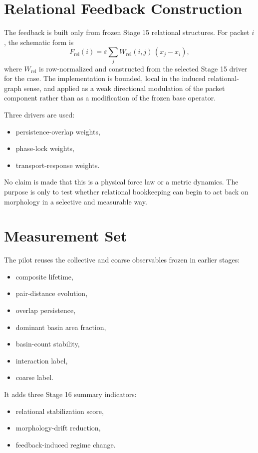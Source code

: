 \documentclass[11pt]{article}
\begin{document}
\section{Relational Feedback Construction}

The feedback is built only from frozen Stage 15 relational structures. For packet $i$, the schematic form is
\[
F_{\mathrm{rel}}(i) = \varepsilon \sum_j W_{\mathrm{rel}}(i,j)\,(x_j - x_i),
\]
where $W_{\mathrm{rel}}$ is row-normalized and constructed from the selected Stage 15 driver for the case. The implementation is bounded, local in the induced relational-graph sense, and applied as a weak directional modulation of the packet component rather than as a modification of the frozen base operator.

Three drivers are used:
\begin{itemize}
\item persistence-overlap weights,
\item phase-lock weights,
\item transport-response weights.
\end{itemize}

No claim is made that this is a physical force law or a metric dynamics. The purpose is only to test whether relational bookkeeping can begin to act back on morphology in a selective and measurable way.

\section{Measurement Set}

The pilot reuses the collective and coarse observables frozen in earlier stages:
\begin{itemize}
\item composite lifetime,
\item pair-distance evolution,
\item overlap persistence,
\item dominant basin area fraction,
\item basin-count stability,
\item interaction label,
\item coarse label.
\end{itemize}

It adds three Stage 16 summary indicators:
\begin{itemize}
\item relational stabilization score,
\item morphology-drift reduction,
\item feedback-induced regime change.
\end{itemize}
\end{document}

